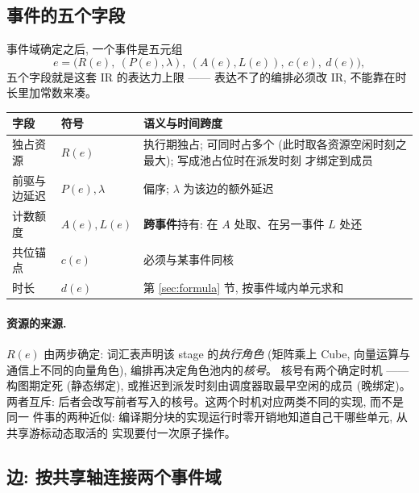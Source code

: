 \documentclass[11pt,a4paper]{article}
\begin{document}
\subsection{事件的五个字段}
\label{sec:fields}

事件域确定之后, 一个事件是五元组
\begin{equation}
e = \big(R(e),\ (P(e),\lambda),\ (A(e),L(e)),\ c(e),\ d(e)\big),
\label{eq:event}
\end{equation}
五个字段就是这套 IR 的表达力上限 —— 表达不了的编排必须改 IR, 不能靠在时长里加常数来凑。

\begin{center}
\begin{tabular}{@{}llp{6.6cm}@{}}
\toprule
字段 & 符号 & 语义与时间跨度 \\
\midrule
独占资源 & $R(e)$
 & 执行期独占; 可同时占多个 (此时取各资源空闲时刻之最大); 写成池占位时在派发时刻
   才绑定到成员 \\
前驱与边延迟 & $P(e), \lambda$ & 偏序; $\lambda$ 为该边的额外延迟 \\
计数额度 & $A(e), L(e)$
 & \textbf{跨事件}持有: 在 $A$ 处取、在另一事件 $L$ 处还 \\
共位锚点 & $c(e)$ & 必须与某事件同核 \\
时长 & $d(e)$ & 第 \ref{sec:formula} 节, 按事件域内单元求和 \\
\bottomrule
\end{tabular}
\end{center}

\paragraph{资源的来源.} $R(e)$ 由两步确定: 词汇表声明该 stage 的\emph{执行角色}
(矩阵乘上 Cube, 向量运算与通信上不同的向量角色), 编排再决定角色池内的\emph{核号}。
核号有两个确定时机 —— 构图期定死 (静态绑定), 或推迟到派发时刻由调度器取最早空闲的成员
(晚绑定)。两者互斥: 后者会改写前者写入的核号。这两个时机对应两类不同的实现, 而不是同一
件事的两种近似: 编译期分块的实现运行时零开销地知道自己干哪些单元, 从共享游标动态取活的
实现要付一次原子操作。

\subsection{边: 按共享轴连接两个事件域}
\label{sec:edges}
\end{document}

